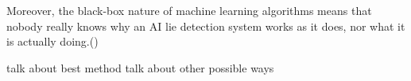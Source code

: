 Moreover, the black-box nature of
machine learning algorithms means that nobody really knows why an AI lie
detection system works as it does, nor what it is actually doing.(\cite{book_fake})

talk about best method
\newline
talk about other possible ways